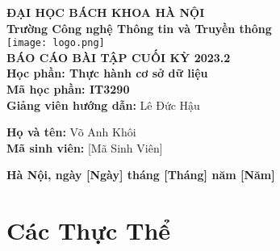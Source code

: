 \documentclass[a4paper,12pt]{article}
\begin{document}
\begin{titlepage}
    \begin{center}
        \textbf{\large ĐẠI HỌC BÁCH KHOA HÀ NỘI}\\
        \textbf{\large Trường Công nghệ Thông tin và Truyền thông}\\[1cm]
        \texttt{[image: logo.png]} \\[3cm] %
       
        
        \textbf{\Huge BÁO CÁO BÀI TẬP CUỐI KỲ 2023.2}\\[0.5cm]
        \textbf{\Huge Học phần: Thực hành cơ sở dữ liệu}\\[0.5cm]
        \textbf{\Huge Mã học phần: IT3290}\\[0.5cm]
        \textbf{Giảng viên hướng dẫn:} Lê Đức Hậu\\
        \begin{flushleft}
            \textbf{Họ và tên:} Võ Anh Khôi\\[0.5cm]
            \textbf{Mã sinh viên:} [Mã Sinh Viên]\\[0.5cm]
        
        \end{flushleft}
        
        \vfill
        
        \textbf{\large Hà Nội, ngày [Ngày] tháng [Tháng] năm [Năm]}
        
    \end{center}
\end{titlepage}

\section{Các Thực Thể}
\end{document}
